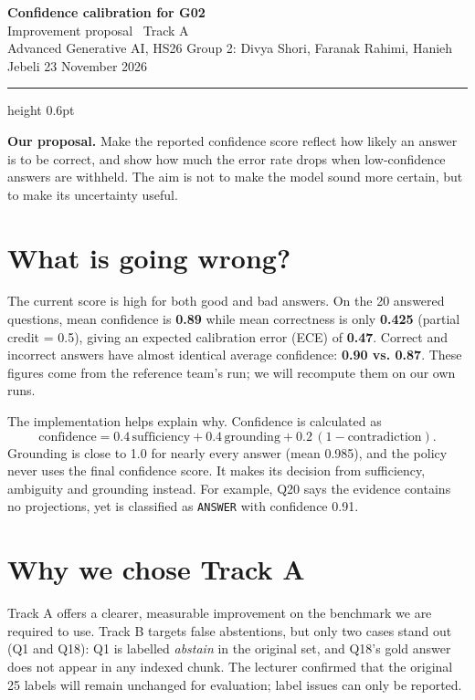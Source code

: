 \documentclass[9pt,a4paper]{extarticle}
\begin{document}
{\color{navy}\fontsize{17}{19}\selectfont\bfseries Confidence calibration for G02}\\[-1pt]
{\color{muted}\small Improvement proposal \textbar\ Track A}\\[5pt]
{\footnotesize Advanced Generative AI, HS26 \quad\textbullet\quad Group 2: Divya Shori, Faranak Rahimi, Hanieh Jebeli \hfill 23 November 2026}
\vspace{5pt}\par\color{rule}\hrule height 0.6pt\color{black}\vspace{5pt}

\textbf{Our proposal.} Make the reported confidence score reflect how likely an answer is to be correct, and show how much the error rate drops when low-confidence answers are withheld. The aim is not to make the model sound more certain, but to make its uncertainty useful.

\section*{What is going wrong?}
The current score is high for both good and bad answers. On the 20 answered questions, mean confidence is \textbf{0.89} while mean correctness is only \textbf{0.425} (partial credit = 0.5), giving an expected calibration error (ECE) of \textbf{0.47}. Correct and incorrect answers have almost identical average confidence: \textbf{0.90 vs. 0.87}. These figures come from the reference team's run; we will recompute them on our own runs.

The implementation helps explain why. Confidence is calculated as
\[
\text{confidence}=0.4\,\text{sufficiency}+0.4\,\text{grounding}+0.2\,(1-\text{contradiction}).
\]
Grounding is close to 1.0 for nearly every answer (mean 0.985), and the policy never uses the final confidence score. It makes its decision from sufficiency, ambiguity and grounding instead. For example, Q20 says the evidence contains no projections, yet is classified as \texttt{ANSWER} with confidence 0.91.

\section*{Why we chose Track A}
Track A offers a clearer, measurable improvement on the benchmark we are required to use. Track B targets false abstentions, but only two cases stand out (Q1 and Q18): Q1 is labelled \emph{abstain} in the original set, and Q18's gold answer does not appear in any indexed chunk. The lecturer confirmed that the original 25 labels will remain unchanged for evaluation; label issues can only be reported.
\end{document}

